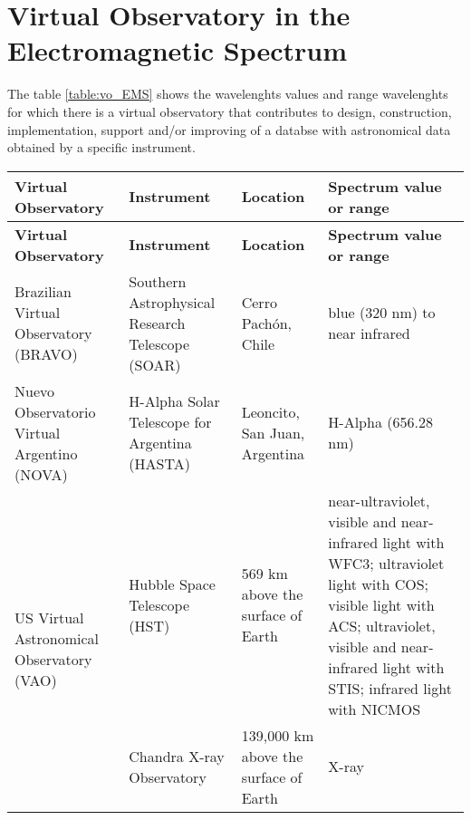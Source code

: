\section{Virtual Observatory in the Electromagnetic Spectrum}
The table \ref{table:vo_EMS} shows the wavelenghts values and range wavelenghts
for which there is a virtual observatory that contributes to design,
construction, implementation, support and/or improving of a databse with
astronomical data obtained by a specific instrument.\\

\begin{center}  
\begin{longtable}{|m{3cm}|m{3cm}|m{3cm}|m{5cm}|}
    \hline                                                                      
    \textbf{Virtual Observatory} & \textbf{Instrument} & \textbf{Location} &
    \textbf{Spectrum value or range} \\
    \hline                                                                      
    \endfirsthead
    \hline                                                                      
    \textbf{Virtual Observatory} & \textbf{Instrument} & \textbf{Location} &
    \textbf{Spectrum value or range} \\
    \hline                                                                      
    \endhead
    Brazilian Virtual Observatory (BRAVO) & Southern Astrophysical Research
    Telescope (SOAR) & Cerro Pach\'{o}n, Chile & blue (320 nm) to near infrared
    \cite{website:SOAR_EMS} \\
    \hline                                                                      
    Nuevo Observatorio Virtual Argentino (NOVA) & H-Alpha Solar Telescope for
    Argentina (HASTA) & Leoncito, San Juan, Argentina & H-Alpha (656.28 nm)
    \cite{website:HASTA_EMS} \\
    \hline
    \multirow{3}{3cm}{US Virtual Astronomical Observatory (VAO)} & Hubble Space
    Telescope (HST) & 569 km above the surface of Earth & near-ultraviolet,
    visible and near-infrared light with WFC3; ultraviolet light with COS;
    visible light with ACS; ultraviolet, visible and near-infrared light with
    STIS; infrared light with NICMOS \cite{website:HST_EMS} \\
     \cline{2-4}
     & Chandra X-ray Observatory & 139,000 km above the surface of Earth & X-ray

\end{longtable}
\end{center}
